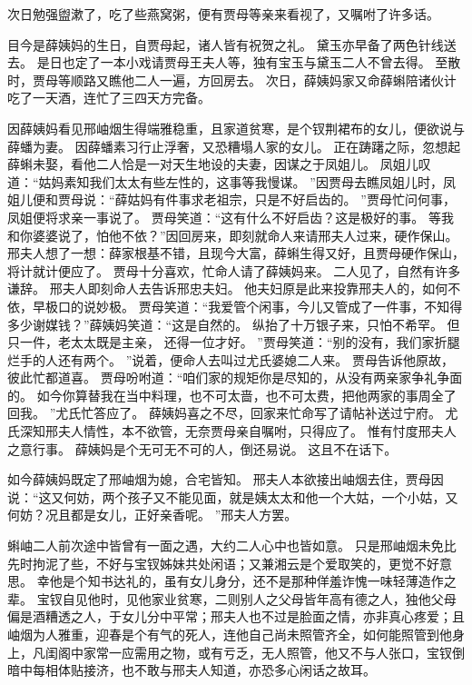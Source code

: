 次日勉强盥漱了，吃了些燕窝粥，便有贾母等亲来看视了，又嘱咐了许多话。
\par
目今是薛姨妈的生日，自贾母起，诸人皆有祝贺之礼。
黛玉亦早备了两色针线送去。
是日也定了一本小戏请贾母王夫人等，独有宝玉与黛玉二人不曾去得。
至散时，贾母等顺路又瞧他二人一遍，方回房去。
次日，薛姨妈家又命薛蝌陪诸伙计吃了一天酒，连忙了三四天方完备。
\par
因薛姨妈看见邢岫烟生得端雅稳重，且家道贫寒，是个钗荆裙布的女儿，便欲说与薛蟠为妻。
因薛蟠素习行止浮奢，又恐糟塌人家的女儿。
正在踌躇之际，忽想起薛蝌未娶，看他二人恰是一对天生地设的夫妻，因谋之于凤姐儿。
凤姐儿叹道：“姑妈素知我们太太有些左性的，这事等我慢谋。
”因贾母去瞧凤姐儿时，凤姐儿便和贾母说：“薛姑妈有件事求老祖宗，只是不好启齿的。
”贾母忙问何事，凤姐便将求亲一事说了。
贾母笑道：“这有什么不好启齿？这是极好的事。
等我和你婆婆说了，怕他不依？”因回房来，即刻就命人来请邢夫人过来，硬作保山。
邢夫人想了一想：薛家根基不错，且现今大富，薛蝌生得又好，且贾母硬作保山，将计就计便应了。
贾母十分喜欢，忙命人请了薛姨妈来。
二人见了，自然有许多谦辞。
邢夫人即刻命人去告诉邢忠夫妇。
他夫妇原是此来投靠邢夫人的，如何不依，早极口的说妙极。
贾母笑道：“我爱管个闲事，今儿又管成了一件事，不知得多少谢媒钱？”薛姨妈笑道：“这是自然的。
纵抬了十万银子来，只怕不希罕。
但只一件，老太太既是主亲，
还得一位才好。
”贾母笑道：“别的没有，我们家折腿烂手的人还有两个。
”说着，便命人去叫过尤氏婆媳二人来。
贾母告诉他原故，彼此忙都道喜。
贾母吩咐道：“咱们家的规矩你是尽知的，从没有两亲家争礼争面的。
如今你算替我在当中料理，也不可太啬，也不可太费，把他两家的事周全了回我。
”尤氏忙答应了。
薛姨妈喜之不尽，回家来忙命写了请帖补送过宁府。
尤氏深知邢夫人情性，本不欲管，无奈贾母亲自嘱咐，只得应了。
惟有忖度邢夫人之意行事。
薛姨妈是个无可无不可的人，倒还易说。
这且不在话下。
\par
如今薛姨妈既定了邢岫烟为媳，合宅皆知。
邢夫人本欲接出岫烟去住，贾母因说：“这又何妨，两个孩子又不能见面，就是姨太太和他一个大姑，一个小姑，又何妨？况且都是女儿，正好亲香呢。
”邢夫人方罢。
\par
蝌岫二人前次途中皆曾有一面之遇，大约二人心中也皆如意。
只是邢岫烟未免比先时拘泥了些，不好与宝钗姊妹共处闲语；又兼湘云是个爱取笑的，更觉不好意思。
幸他是个知书达礼的，虽有女儿身分，还不是那种佯羞诈愧一味轻薄造作之辈。
宝钗自见他时，见他家业贫寒，二则别人之父母皆年高有德之人，独他父母偏是酒糟透之人，于女儿分中平常；邢夫人也不过是脸面之情，亦非真心疼爱；且岫烟为人雅重，迎春是个有气的死人，连他自己尚未照管齐全，如何能照管到他身上，凡闺阁中家常一应需用之物，或有亏乏，无人照管，他又不与人张口，宝钗倒暗中每相体贴接济，也不敢与邢夫人知道，亦恐多心闲话之故耳。
